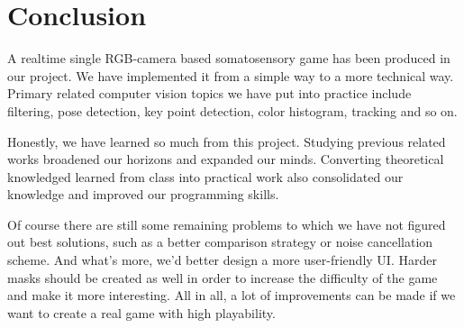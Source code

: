 \documentclass[11pt,twocolumn,letterpaper]{article}
\begin{document}
\section{Conclusion}
    \par A realtime single RGB-camera based somatosensory game has been produced in our project. We have implemented it from a simple way to a more technical way. Primary related computer vision topics we have put into practice include filtering, pose detection, key point detection, color histogram, tracking and so on.
    \par Honestly, we have learned so much from this project. Studying previous related works broadened our horizons and expanded our minds. Converting theoretical knowledged learned from class into practical work also consolidated our knowledge and improved our programming skills.
    \par Of course there are still some remaining problems to which we have not figured out best solutions, such as a better comparison strategy or noise cancellation scheme. And what's more, we'd better design a more user-friendly UI. Harder masks should be created as well in order to increase the difficulty of the game and make it more interesting. All in all, a lot of improvements can be made if we want to create a real game with high playability.

{\small


}
\end{document}
